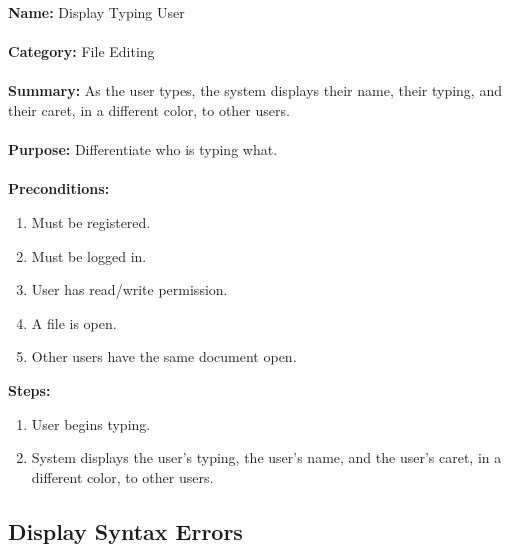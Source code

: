 \documentclass[14pt, a4paper]{article}
\begin{document}
\begin{framed}
	\noindent\textbf{Name:} Display Typing User \\ \\
	\textbf{Category:} File Editing \\ \\
	\textbf{Summary:} As the user types, the system displays their name, their typing, and their caret, in a different color, to other users. \\ \\
	\textbf{Purpose:} Differentiate who is typing what. \\ \\
	\textbf{Preconditions:} 
	\begin{enumerate}
		\item Must be registered.
		\item Must be logged in.
		\item User has read/write permission.
		\item A file is open.
		\item Other users have the same document open.
	\end{enumerate}
	\textbf{Steps:}
	\begin{enumerate}
		\item User begins typing.
		\item System displays the user's typing, the user's name, and the user's caret, in a different color, to other users.
	\end{enumerate}
\end{framed}

\newpage

\subsection{Display Syntax Errors}
\end{document}
